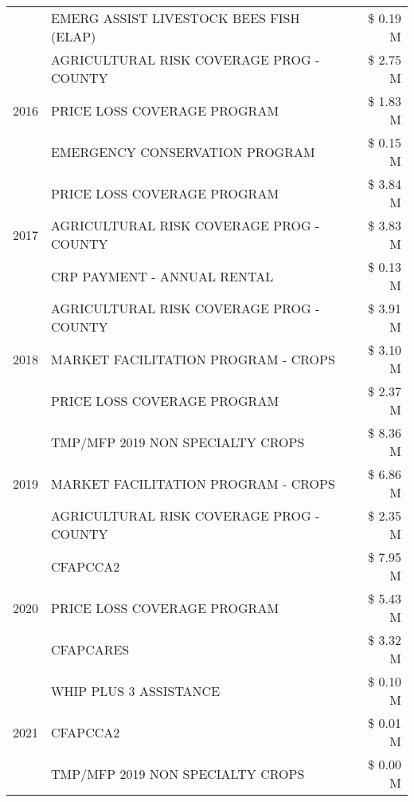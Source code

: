 \begin{tabular}{llr}
 & EMERG ASSIST LIVESTOCK BEES FISH (ELAP) & \$ 0.19 M \\
\cline{1-3}
\multirow[t]{3}{*}{2016} & AGRICULTURAL RISK COVERAGE PROG - COUNTY & \$ 2.75 M \\
 & PRICE LOSS COVERAGE PROGRAM & \$ 1.83 M \\
 & EMERGENCY CONSERVATION PROGRAM & \$ 0.15 M \\
\cline{1-3}
\multirow[t]{3}{*}{2017} & PRICE LOSS COVERAGE PROGRAM & \$ 3.84 M \\
 & AGRICULTURAL RISK COVERAGE PROG - COUNTY & \$ 3.83 M \\
 & CRP PAYMENT - ANNUAL RENTAL & \$ 0.13 M \\
\cline{1-3}
\multirow[t]{3}{*}{2018} & AGRICULTURAL RISK COVERAGE PROG - COUNTY & \$ 3.91 M \\
 & MARKET FACILITATION PROGRAM - CROPS & \$ 3.10 M \\
 & PRICE LOSS COVERAGE PROGRAM & \$ 2.37 M \\
\cline{1-3}
\multirow[t]{3}{*}{2019} & TMP/MFP 2019 NON SPECIALTY CROPS & \$ 8.36 M \\
 & MARKET FACILITATION PROGRAM - CROPS & \$ 6.86 M \\
 & AGRICULTURAL RISK COVERAGE PROG - COUNTY & \$ 2.35 M \\
\cline{1-3}
\multirow[t]{3}{*}{2020} & CFAPCCA2 & \$ 7.95 M \\
 & PRICE LOSS COVERAGE PROGRAM & \$ 5.43 M \\
 & CFAPCARES & \$ 3.32 M \\
\cline{1-3}
\multirow[t]{3}{*}{2021} & WHIP PLUS 3 ASSISTANCE & \$ 0.10 M \\
 & CFAPCCA2 & \$ 0.01 M \\
 & TMP/MFP 2019 NON SPECIALTY CROPS & \$ 0.00 M \\
\cline{1-3}
\bottomrule
\end{tabular}
